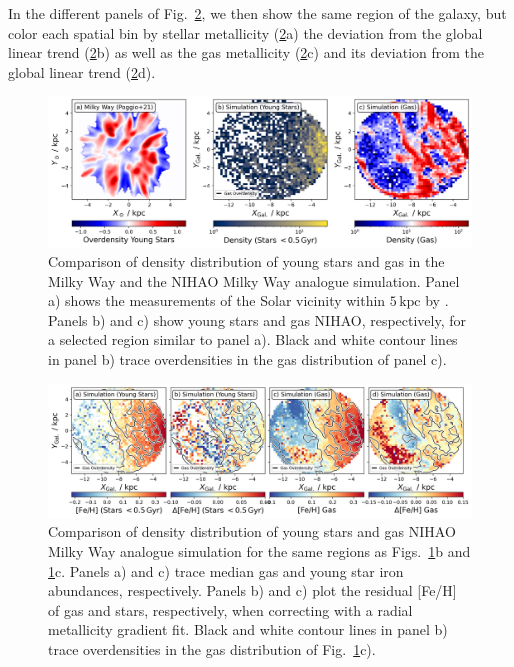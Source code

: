 \documentclass[fleqn,usenatbib]{mnras}
\begin{document}
In the different panels of Fig.~\ref{fig:nihao_gas_stars_density_overlay}, we then show the same region of the galaxy, but color each spatial bin by stellar metallicity (\ref{fig:nihao_gas_stars_density_overlay}a) the deviation from the global linear trend (\ref{fig:nihao_gas_stars_density_overlay}b) as well as the gas metallicity (\ref{fig:nihao_gas_stars_density_overlay}c) and its deviation from the global linear trend (\ref{fig:nihao_gas_stars_density_overlay}d).

\begin{figure}
    \centering
    \includegraphics[width=\textwidth]{figures/overdensities_mw_vs_nihao.png}
    \caption{Comparison of density distribution of young stars and gas in the Milky Way and the NIHAO Milky Way analogue simulation. Panel a) shows the measurements of the Solar vicinity within $5\,\mathrm{kpc}$ by \citet{Poggio2021}. Panels b) and c) show young stars and gas NIHAO, respectively, for a selected region similar to panel a). Black and white contour lines in panel b) trace overdensities in the gas distribution of panel c).}
    \label{fig:overdensities_mw_vs_nihao}
\end{figure}

\begin{figure}
    \centering
    \includegraphics[width=\textwidth]{figures/nihao_gas_stars_density_overlay.png}
    \caption{Comparison of density distribution of young stars and gas NIHAO Milky Way analogue simulation for the same regions as Figs.~\ref{fig:overdensities_mw_vs_nihao}b and \ref{fig:overdensities_mw_vs_nihao}c. Panels a) and c) trace median gas and young star iron abundances, respectively. Panels b) and c) plot the residual [Fe/H] of gas and stars, respectively, when correcting with a radial metallicity gradient fit. Black and white contour lines in panel b) trace overdensities in the gas distribution of Fig.~\ref{fig:overdensities_mw_vs_nihao}c).}
    \label{fig:nihao_gas_stars_density_overlay}
\end{figure}
\end{document}
